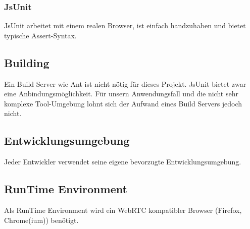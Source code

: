 \subsubsection{JsUnit}
JsUnit arbeitet mit einem realen Browser, ist einfach handzuhaben und bietet typische Assert-Syntax.


\subsection{Building}
Ein Build Server wie Ant ist nicht nötig für dieses Projekt. JsUnit bietet zwar eine Anbindungsmöglichkeit. Für unsern Anwendungsfall und die nicht sehr komplexe Tool-Umgebung lohnt sich der Aufwand eines Build Servers jedoch nicht.


\subsection{Entwicklungsumgebung}
Jeder Entwickler verwendet seine eigene bevorzugte Entwicklungsumgebung.


\subsection{RunTime Environment}
Als RunTime Environment wird ein WebRTC kompatibler Browser (Firefox, Chrome(ium)) benötigt.


